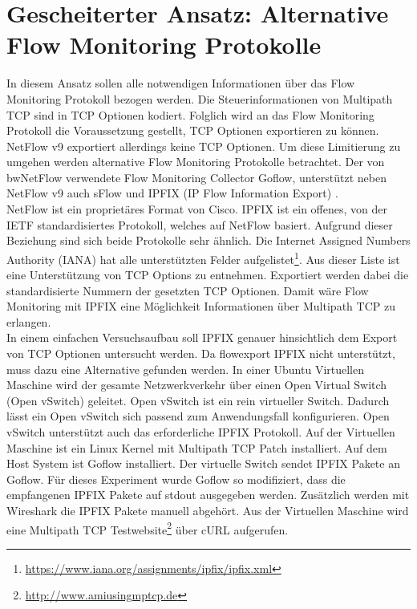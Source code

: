 \documentclass[a4paper, 12pt]{article}
\begin{document}
\section{Gescheiterter Ansatz: Alternative Flow Monitoring Protokolle}
In diesem Ansatz sollen alle notwendigen Informationen über das Flow Monitoring Protokoll bezogen werden.
Die Steuerinformationen von Multipath TCP sind in TCP Optionen kodiert.
Folglich wird an das Flow Monitoring Protokoll die Voraussetzung gestellt, TCP Optionen exportieren zu können.
NetFlow v9 exportiert allerdings keine TCP Optionen. 
Um diese Limitierung zu umgehen werden alternative Flow Monitoring Protokolle betrachtet. 
Der von bwNetFlow verwendete Flow Monitoring Collector Goflow, unterstützt neben NetFlow v9 auch sFlow \cite{li2013survey, phaal2001rfc3176} und IPFIX (IP Flow Information Export) \cite{li2013survey, claise2013specification}.
\\
NetFlow ist ein proprietäres Format von Cisco. IPFIX ist ein offenes, von der IETF standardisiertes Protokoll, welches auf NetFlow basiert. 
Aufgrund dieser Beziehung sind sich beide Protokolle sehr ähnlich.
Die Internet Assigned Numbers Authority (IANA) hat alle unterstützten Felder aufgelistet\footnote{\url{https://www.iana.org/assignments/ipfix/ipfix.xml}}.
Aus dieser Liste ist eine Unterstützung von TCP Options zu entnehmen.
Exportiert werden dabei die standardisierte Nummern der gesetzten TCP Optionen.
Damit wäre Flow Monitoring mit IPFIX eine Möglichkeit Informationen über Multipath TCP zu erlangen.
\\
In einem einfachen Versuchsaufbau soll IPFIX genauer hinsichtlich dem Export von TCP Optionen untersucht werden.
Da flowexport IPFIX nicht unterstützt, muss dazu eine Alternative gefunden werden.
In einer Ubuntu Virtuellen Maschine wird der gesamte Netzwerkverkehr über einen Open Virtual Switch (Open vSwitch) \cite{pfaff2015design} geleitet.
Open vSwitch ist ein rein virtueller Switch. Dadurch lässt ein Open vSwitch sich passend zum Anwendungsfall konfigurieren.
Open vSwitch unterstützt auch das erforderliche IPFIX Protokoll. 
Auf der Virtuellen Maschine ist ein Linux Kernel mit Multipath TCP Patch installiert.
Auf dem Host System ist Goflow installiert. Der virtuelle Switch sendet IPFIX Pakete an Goflow. 
Für dieses Experiment wurde Goflow so modifiziert, dass die empfangenen IPFIX Pakete auf stdout ausgegeben werden.
Zusätzlich werden mit Wireshark die IPFIX Pakete manuell abgehört.
Aus der Virtuellen Maschine wird eine Multipath TCP Testwebsite\footnote{\url{http://www.amiusingmptcp.de}} über cURL aufgerufen.
 
\end{document}
